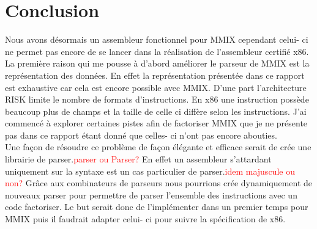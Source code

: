 \documentclass {article}
\theoremstyle{definition}
\theoremstyle{remark}
\newcommand{\todo}[1]{\textcolor{red}{#1}}
\begin{document}
\section{Conclusion}

Nous avons désormais un assembleur fonctionnel pour MMIX cependant celui- ci ne permet pas encore de se lancer
dans la réalisation de l'assembleur certifié x86.\\
La première raison qui me pousse à d'abord améliorer le parseur de MMIX est la représentation des données.
En effet la représentation présentée dans ce rapport est exhaustive car cela est encore possible avec
MMIX. D'une part l'architecture RISK limite le nombre de formats d'instructions. En x86 une instruction possède
beaucoup plus de champs et la taille de celle ci diffère selon les instructions. J'ai commencé à explorer certaines
pistes afin de factoriser MMIX que je ne présente pas dans ce rapport étant donné que celles- ci n'ont pas encore abouties.
\\
Une façon de résoudre ce problème de façon élégante et efficace serait de crée une librairie de parser.\todo{parser ou Parser?}
En effet un assembleur s'attardant uniquement sur la syntaxe est un cas particulier de parser.\todo{idem majuscule ou non?}
Grâce aux combinateurs de parseurs nous pourrions crée dynamiquement de nouveaux parser pour
permettre de parser l'ensemble des instructions avec un code factoriser. Le but serait donc de l'implémenter
dans un premier temps pour MMIX puis il faudrait adapter celui- ci pour suivre la spécification de x86.

\end{document}
